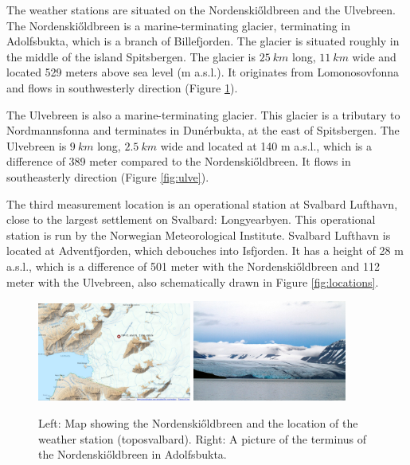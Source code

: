 \documentclass[11pt]{report}
\begin{document}
The weather stations are situated on the Nordenski\H{o}ldbreen and the Ulvebreen. The Nordenski\H{o}ldbreen is a marine-terminating glacier, terminating in Adolfsbukta, which is a branch of Billefjorden. The glacier is situated roughly in the middle of the island Spitsbergen. The glacier is $\SI{25}{km}$ long, $\SI{11}{km}$ wide and located 529 meters above sea level (m a.s.l.). It originates from Lomonosovfonna and flows in southwesterly direction (Figure \ref{fig:norden}). 

The Ulvebreen is also a marine-terminating glacier. This glacier is a tributary to Nordmannsfonna and terminates in Dunérbukta, at the east of Spitsbergen. The Ulvebreen is $\SI{9}{km}$ long, $\SI{2.5}{km}$ wide and located at 140 m a.s.l., which is a difference of 389 meter compared to the Nordenski\H{o}ldbreen. It flows in southeasterly direction (Figure \ref{fig:ulve}). 

The third measurement location is an operational station at Svalbard Lufthavn, close to the largest settlement on Svalbard: Longyearbyen. This operational station is run by the Norwegian Meteorological Institute. Svalbard Lufthavn is located at Adventfjorden, which debouches into Isfjorden. It has a height of 28 m a.s.l., which is a difference of 501 meter with the Nordenski\H{o}ldbreen and 112 meter with the Ulvebreen, also schematically drawn in Figure \ref{fig:locations}.

\begin{figure}[h]
\includegraphics[scale=1, width=0.45\textwidth]{nskimap.jpg}
\includegraphics[scale=1, width=0.45\textwidth]{view1.jpg}
\centering{}
\caption{Left: Map showing the Nordenski\H{o}ldbreen and the location of the weather station (toposvalbard). Right: A picture of the terminus of the Nordenski\H{o}ldbreen in Adolfsbukta.}
\label{fig:norden}
\end{figure}
\end{document}
